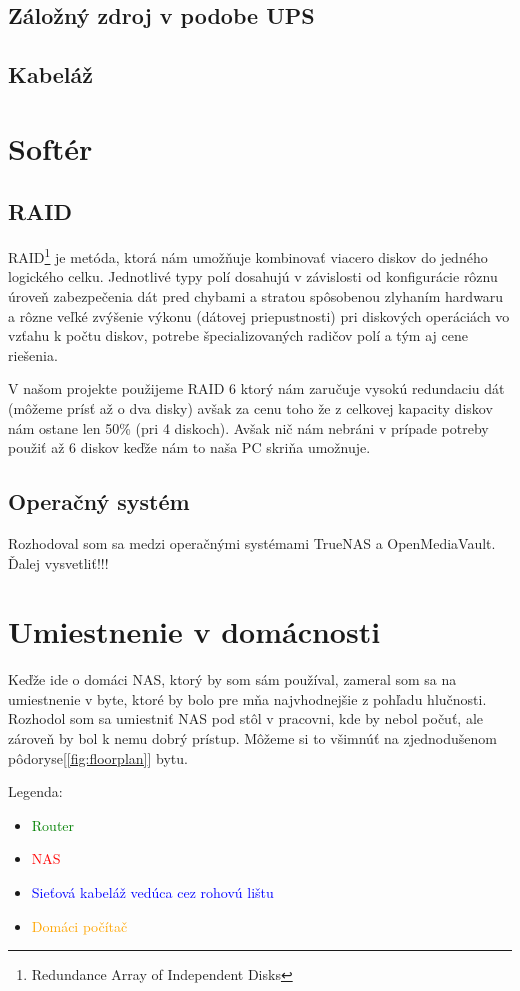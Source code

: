 \documentclass[12pt,oneside,slovak,a4paper]{article}
\begin{document}
\subsection{Záložný zdroj v podobe UPS}

\subsection{Kabeláž}

\section{Softér}

\subsection{RAID}
RAID\footnote{Redundance Array of Independent Disks} je metóda, ktorá nám umožňuje kombinovať viacero diskov do jedného logického celku. Jednotlivé typy polí dosahujú v závislosti od konfigurácie rôznu úroveň zabezpečenia dát pred chybami a stratou spôsobenou zlyhaním hardwaru a rôzne veľké zvýšenie výkonu (dátovej priepustnosti) pri diskových operáciách vo vzťahu k počtu diskov, potrebe špecializovaných radičov polí a tým aj cene riešenia.

V našom projekte použijeme RAID 6 ktorý nám zaručuje vysokú redundaciu dát (môžeme prísť až o dva disky) avšak za cenu toho že z celkovej kapacity diskov nám ostane len 50\% (pri 4 diskoch). Avšak nič nám nebráni v prípade potreby použiť až 6 diskov keďže nám to naša PC skriňa umožnuje.

\subsection{Operačný systém}
Rozhodoval som sa medzi operačnými systémami TrueNAS a OpenMediaVault. Ďalej vysvetliť!!!

\section{Umiestnenie v domácnosti}
Keďže ide o domáci NAS, ktorý by som sám používal, zameral som sa na umiestnenie v byte, ktoré by bolo pre mňa najvhodnejšie z pohľadu hlučnosti. Rozhodol som sa umiestniť NAS pod stôl v pracovni, kde by nebol počuť, ale zároveň by bol k nemu dobrý prístup. Môžeme si to všimnúť na zjednodušenom pôdoryse[\ref{fig:floorplan}] bytu.

Legenda:
\begin{spacing}{1.0}
\begin{itemize}
	\item \textcolor{green}{Router}
	\item \textcolor{red}{NAS}
	\item \textcolor{blue}{Sieťová kabeláž vedúca cez rohovú lištu}
	\item \textcolor{orange}{Domáci počítač}
\end{itemize}
\end{spacing}
\end{document}
